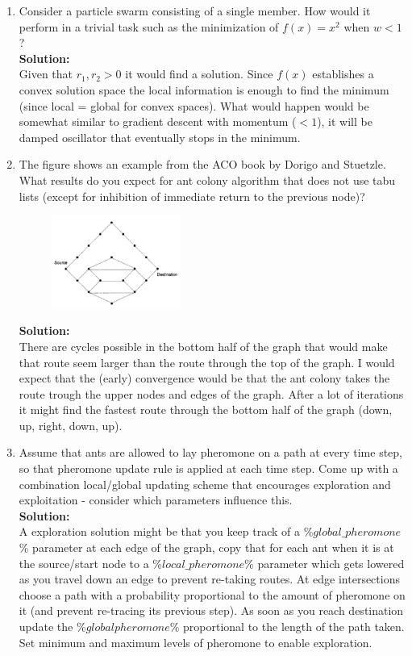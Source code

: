 \documentclass[a4paper]{article}
\begin{document}
\begin{enumerate}
	\item Consider a particle swarm consisting of a single member. How would it perform in a trivial task such as the minimization of $f(x) = x^2$ when $w < 1$?\\
	\textbf{Solution:}\\
	Given that $r_1, r_2 > 0$ it would find a solution. Since $f(x)$ establishes a convex solution space the local information is enough to find the minimum (since local = global for convex spaces). What would happen would be somewhat similar to gradient descent with momentum ($<1$), it will be damped oscillator that eventually stops in the minimum.
	
	\item The figure shows an example from the ACO book by Dorigo and Stuetzle. What results do you expect for ant colony algorithm that does not use tabu lists (except for inhibition of immediate return to the previous node)?
	
		\begin{figure}[H]
	    \centering
  	    \includegraphics[width=0.4\textwidth]{images/task3.PNG}
	    \end{figure}	
	
	
	\textbf{Solution:}\\
	There are cycles possible in the bottom half of the graph that would make that route seem larger than the route through the top of the graph. I would expect that the (early) convergence would be that the ant colony takes the route trough the upper nodes and edges of the graph. After a lot of iterations it might find the fastest route through the bottom half of the graph (down, up, right, down, up).
	
	\item Assume that ants are allowed to lay pheromone on a path at every time step, so that pheromone update rule is applied at each time step. Come up with a combination local/global updating scheme that encourages exploration and exploitation - consider which parameters influence this.\\
	\textbf{Solution:}\\
	A exploration solution might be that you keep track of a \%$global\_pheromone$\% parameter at each edge of the graph, copy that for each ant when it is at the source/start node to a \%$local\_pheromone$\% parameter which gets lowered as you travel down an edge to prevent re-taking routes. At edge intersections choose a path with a probability proportional to the amount of pheromone on it (and prevent re-tracing its previous step). As soon as you reach destination update the \%$global pheromone$\% proportional to the length of the path taken. Set minimum and maximum levels of pheromone to enable exploration.



\end{enumerate}
\end{document}
